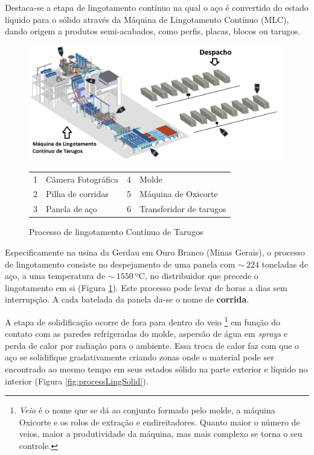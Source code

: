 Destaca-se a etapa de lingotamento contínuo na qual o aço é convertido do estado líquido para o sólido através da Máquina de Lingotamento Contínuo (MLC), dando origem a produtos semi-acabados, como perfis, placas, blocos ou tarugos.

\begin{figure}[htbp]
	\centering
	\includegraphics[width=1.1\linewidth]{figuras/Steel/process.png}
	\caption{Processo de lingotamento Contínuo de Tarugos}
	\begin{tabular}{r@{: }l r@{: }l}
        1 & Câmera Fotográfica & 4 & Molde \\
        2& Pilha de corridas & 5 & Máquina de Oxicorte \\
        3 & Panela de aço& 6 & Transferidor de tarugos \\
    \end{tabular}
	\label{fig:processLing}
\end{figure}

Especificamente na usina da Gerdau em Ouro Branco (Minas Gerais), o processo de lingotamento consiste no despejamento de uma panela com $\sim~224$ toneladas de aço, a uma temperatura de $\sim~1550~$ºC, no distribuidor que precede o lingotamento em si (Figura \ref{fig:processLing}).
%
Este processo pode levar de horas a dias sem interrupção.
%
A cada batelada da panela da-se o nome de \textbf{corrida}.


A etapa de solidificação ocorre de fora para dentro do veio
%
\footnote{\textit{Veio} é o nome que se dá ao conjunto formado pelo molde, a máquina Oxicorte e os rolos de extração e endireitadores. Quanto maior o número de veios, maior a produtividade da máquina, mas mais complexo se torna o seu controle.} 
%
em função do contato com as paredes refrigeradas do molde, aspersão de água em \textit{sprays} e perda de calor por radiação para o ambiente. Essa troca de calor faz com que o aço se solidifique gradativamente criando zonas onde o material pode ser encontrado ao mesmo tempo em seus estados sólido na parte exterior e líquido no interior (Figura \ref{fig:processLingSolid}).


